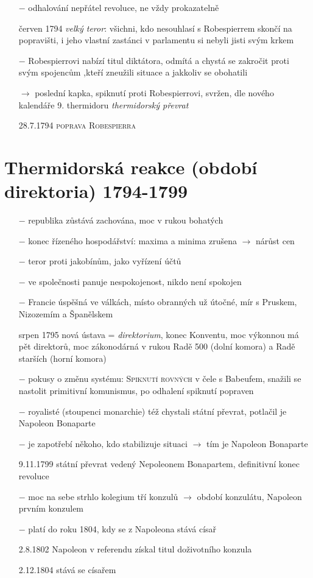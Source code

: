 \documentclass{article}
\begin{document}
\begin{itemize}
    \item[$-$] odhalování nepřátel revoluce, ne vždy prokazatelně
    \item[červen 1794] \textit{velký teror}: všichni, kdo nesouhlasí s Robespierrem skončí na popravišti, i jeho vlastní zastánci v parlamentu si nebyli jisti svým krkem
    \item[$-$] Robespierrovi nabízí titul diktátora, odmítá a chystá se zakročit proti svým spojencům ,kteří zneužili situace a jakkoliv se obohatili
    \item[$\rightarrow$ ]  poslední kapka, spiknutí proti Robespierrovi, svržen, dle nového kalendáře 9. thermidoru \textit{thermidorský převrat}
    \item[28.7.1794]  \textsc{poprava Robespierra}
\end{itemize}

\section*{Thermidorská reakce (období direktoria) 1794-1799}
\begin{itemize}
    \vspace{-0.5em}
    \setlength\itemsep{0.15em}
    \item[$-$] republika zůstává zachována, moc v rukou bohatých
    \item[$-$] konec řízeného hospodářství: maxima a minima zrušena $\rightarrow$ nárůst cen
    \item[$-$] teror proti jakobínům, jako vyřízení účtů
    \item[$-$] ve společnosti panuje nespokojenost, nikdo není spokojen
    \item[$-$] Francie úspěšná ve válkách, místo obranných už útočné, mír s Pruskem, Nizozemím a Španělskem
    \item[srpen 1795] nová ústava = \textit{direktorium}, konec Konventu, moc výkonnou má pět direktorů,  moc zákonodárná v rukou Radě 500 (dolní komora) a Radě starších (horní komora)
    \item[$-$] pokusy o změnu systému: \textsc{Spiknutí rovných} v čele s Babeufem, snažili se nastolit primitivní komunismus, po odhalení spiknutí popraven
    \item[$-$] royalisté (stoupenci monarchie) též chystali státní převrat, potlačil je Napoleon Bonaparte
    \item[$-$] je zapotřebí někoho, kdo stabilizuje situaci $\rightarrow$ tím je Napoleon Bonaparte
    \item[9.11.1799] státní převrat vedený Nepoleonem Bonapartem, definitivní konec revoluce
    \item[$-$] moc na sebe strhlo kolegium tří konzulů $\rightarrow$ období konzulátu, Napoleon prvním konzulem
    \item[$-$] platí do roku 1804, kdy se z Napoleona stává císař
    \item[2.8.1802] Napoleon v referendu získal titul doživotního konzula
    \item[2.12.1804] stává se císařem
\end{itemize}
\end{document}
